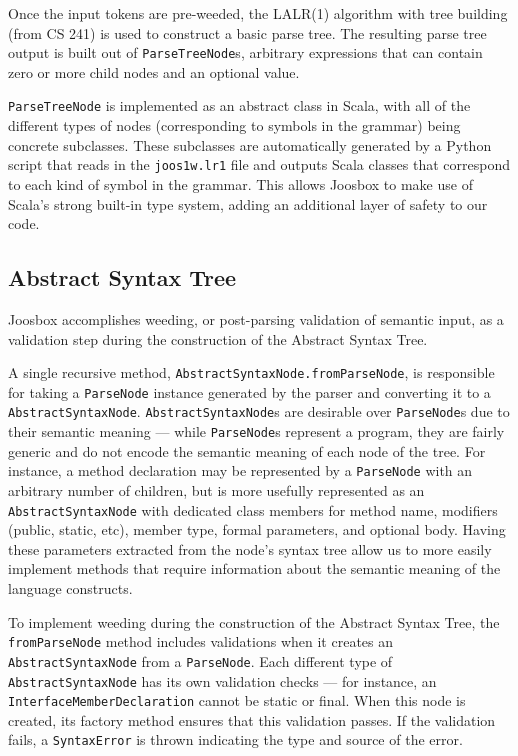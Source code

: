 \documentclass[letterpaper]{article}
\begin{document}
  Once the input tokens are pre-weeded, the LALR(1) algorithm with tree building
  (from CS 241) is used to construct a basic parse tree. The resulting parse 
  tree output is built out of {\tt ParseTreeNode}s, arbitrary expressions
  that can contain zero or more child nodes and an optional value.

  {\tt ParseTreeNode} is implemented as an abstract class in Scala, with all
  of the different types of nodes (corresponding to symbols in the grammar)
  being concrete subclasses. These subclasses are automatically generated
  by a Python script that reads in the {\tt joos1w.lr1} file and outputs
  Scala classes that correspond to each kind of symbol in the grammar. This
  allows Joosbox to make use of Scala's strong built-in type system, adding
  an additional layer of safety to our code.

  \subsection{Abstract Syntax Tree}

  Joosbox accomplishes weeding, or post-parsing validation of semantic input,
  as a validation step during the construction of the Abstract Syntax Tree.

  A single recursive method, {\tt AbstractSyntaxNode.fromParseNode}, is
  responsible for taking a {\tt ParseNode} instance generated by the parser
  and converting it to a {\tt AbstractSyntaxNode}. {\tt AbstractSyntaxNode}s
  are desirable over {\tt ParseNode}s due to their semantic meaning --- while
  {\tt ParseNode}s represent a program, they are fairly generic and do not
  encode the semantic meaning of each node of the tree. For instance, a method
  declaration may be represented by a {\tt ParseNode} with an arbitrary number
  of children, but is more usefully represented as an {\tt AbstractSyntaxNode}
  with dedicated class members for method name, modifiers (public, static,
  etc), member type, formal parameters, and optional body. Having these
  parameters extracted from the node's syntax tree allow us to more easily
  implement methods that require information about the semantic meaning of the
  language constructs.

  To implement weeding during the construction of the Abstract Syntax Tree,
  the {\tt fromParseNode} method includes validations when it creates an {\tt
  AbstractSyntaxNode} from a {\tt ParseNode}. Each different type of {\tt
  AbstractSyntaxNode}  has its own validation checks --- for instance, an {\tt
  InterfaceMemberDeclaration} cannot be static  or final. When this node is
  created, its factory method ensures that this validation passes. If the
  validation  fails, a {\tt SyntaxError} is thrown indicating the type and
  source of the error.
\end{document}

